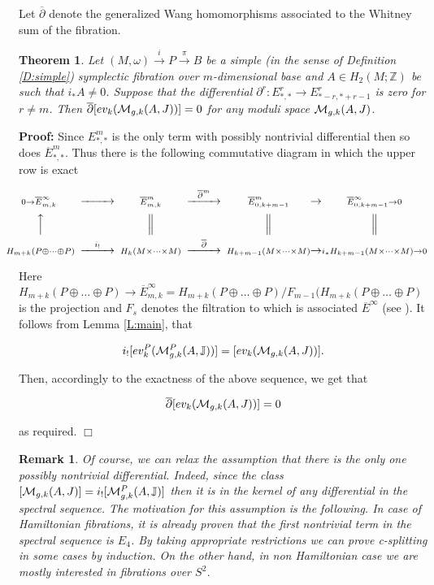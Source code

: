 \documentclass[a4paper,14pt]{article}
\newcommand{\B}[1]{\mathbb #1}
\newcommand{\C}[1]{{\cal #1}}
\newcommand{\map}[1]{\stackrel {#1}\longrightarrow}
\newcommand{\Mo}{(M,\omega )}
\newcommand{\sfib}{\Mo \map{i} P\map{\pi } B}
\newcommand{\pf}{\NI {\bf Proof: }}
\newcommand{\mtimes}{\times \dots \times}
\newcommand{\moplus}{\oplus \dots \oplus}
\newcommand{\QED}{\hfill$\Box$\medskip}
\newcommand{\BS}{{\bigskip}}
\newcommand{\NI}{{\noindent}}
\newtheorem{thm}[theorem]{Theorem}
\newtheorem{rem}[theorem]{Remark}
\numberwithin{equation}{section}
\begin{document}
Let $\overline \partial $ denote
the generalized Wang homomorphisms associated to the Whitney
sum of the fibration.




\begin{thm}\label{T:main}
Let $\sfib $ be a simple (in the sense of Definition
\ref{D:simple})
symplectic fibration over $m$-dimensional 
base and
$A\in H_2(M;\B Z)$ be such that $i_*A\neq 0$.
Suppose that the differential
$\partial ^r :E^r_{*,*}\to E^r_{*-r,*+r-1}$  
is zero for $r\neq m $.
Then 
$\overline \partial [ev_k(\C M_{g,k}(A,J))]  = 0$
for any moduli space $\C M_{g,k}(A,J)$.
\end{thm}





\pf
Since $E^m_{*,*}$ is the only term with possibly 
nontrivial differential then so does $\overline E^m_{*,*}$.
Thus
there is the following commutative diagram in which the
upper row is exact 

$$
\!\!\!\!\!\!\!
\CD
{\scriptstyle
\!\!0\to \overline E^{\infty }_{m,k}} @>>> 
{\scriptstyle \overline E^m_{m,k}} @> {\overline \partial  ^m}>>
{\scriptstyle \overline E^m_{0,k+m-1} }
&\to &
{\scriptstyle \overline E^{\infty }_{0,k+m-1}\to 0}\\
@AAA @| @| @|\\
{\scriptstyle
H_{m+k}(P\moplus P)} @>{i_!}>>
{\scriptstyle  H_k(M \mtimes M)} @>\overline \partial >>
{\scriptstyle  H_{k+m-1}(M\mtimes M)}
&\to &
{\scriptstyle i_*H_{k+m-1}(M \mtimes M)\to 0}
\endCD
$$

\BS
\NI
Here $H_{m+k}(P\oplus \dots \oplus P)\to 
\overline E^{\infty }_{m,k} =
H_{m+k}(P\oplus \dots \oplus P)\slash 
F_{m-1}(H_{m+k}(P\oplus \dots \oplus P)$ is the projection
and $F_s$ denotes the filtration to which is associated 
$\overline E^{\infty }$ (see \cite{sp}).
It follows from Lemma \ref{L:main}, that 

$$
i_! [ev^P_k (\C M^P_{g,k}(A,\B J))] =
[ev_k(\C M_{g,k}(A,J))].
$$

\NI
Then, accordingly to the exactness of the above sequence,
we get that 

$$
\overline \partial [ev_k(\C M_{g,k}(A,J))]=0
$$

\NI
as required. \QED


\begin{rem}
{\em
Of course, we can relax the assumption that there is the only
one possibly nontrivial differential. Indeed,
since the class $[\C M_{g,k}(A,J)]= i_![\C M^P_{g,k}(A,\B J)]$
then it is in the kernel of any differential in the spectral
sequence.
The motivation for this assumption is the following. In case of
Hamiltonian fibrations, it is already proven that the first
nontrivial term in the spectral sequence is $E_4$. By taking
appropriate restrictions we can prove c-splitting in some
cases by induction.
On the other hand, in non Hamiltonian case we are mostly
interested in fibrations over $S^2$.}
\end{rem}
\end{document}
